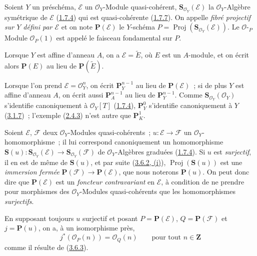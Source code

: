 \begin{definition}[4.1.1]
\label{II.4.1.1-fr}
Soient $Y$ un préschéma, $\mathcal{E}$ un $\mathcal{O}_Y$-Module
quasi-cohérent, $\mathbf{S}_{\mathcal{O}_Y}(\mathcal{E})$ la
$\mathcal{O}_Y$-Algèbre symétrique de $\mathcal{E}$
\textup{(\hyperref[II.1.7.4-fr]{1.7.4})} qui est quasi-cohérente
\textup{(\hyperref[II.1.7.7-fr]{1.7.7})}. On appelle \emph{fibré projectif sur $Y$
défini par $\mathcal{E}$} et on note $\mathbf{P}(\mathcal{E})$ le $Y$-schéma
$P=\operatorname{Proj}(\mathbf{S}_{\mathcal{O}_Y}(\mathcal{E}))$. Le
$\mathcal{O}$-${}_P$Module $\mathcal{O}_P(1)$ est appelé le faisceau
fondamental sur $P$.
\end{definition}

Lorsque $Y$ est affine d'anneau $A$, on a $\mathcal{E}=\widetilde{E}$, où
$E$ est un $A$-module, et on écrit alors $\mathbf{P}(E)$ au lieu de
$\mathbf{P}(\widetilde{E})$.

Lorsque l'on prend $\mathcal{E}=\mathcal{O}_Y^n$, on écrit
$\mathbf{P}_Y^{n-1}$ au lieu de $\mathbf{P}(\mathcal{E})$~; si de plus $Y$
est affine d'anneau $A$, on écrit aussi $\mathbf{P}_A^{n-1}$ au lieu de
$\mathbf{P}_Y^{n-1}$. Comme
$\mathbf{S}_{\mathcal{O}_Y}(\mathcal{O}_Y)$ s'identifie canoniquement à
$\mathcal{O}_Y[T]$ (\hyperref[II.1.7.4-fr]{1.7.4}),
$\mathbf{P}_Y^0$ s'identifie canoniquement à $Y$
(\hyperref[II.3.1.7-fr]{3.1.7})~; l'exemple
(\hyperref[II.2.4.3-fr]{2.4.3}) n'est autre que $\mathbf{P}_K^1$.

\begin{env}[4.1.2]
\label{II.4.1.2-fr}
Soient $\mathcal{E}$, $\mathcal{F}$ deux $\mathcal{O}_Y$-Modules
quasi-cohérents~; $u:\mathcal{E}\to\mathcal{F}$ un
$\mathcal{O}_Y$-homomorphisme~; il lui correspond canoniquement un
homomorphisme
$\mathbf{S}(u):\mathbf{S}_{\mathcal{O}_Y}(\mathcal{E})\to
\mathbf{S}_{\mathcal{O}_Y}(\mathcal{F})$ de $\mathcal{O}_Y$-Algèbres
graduées (\hyperref[II.1.7.4-fr]{1.7.4}). Si $u$ est \emph{surjectif}, il en
est de même de $\mathbf{S}(u)$, et par suite
(\hyperref[II.3.6.2-fr]{3.6.2, (i)}),
$\operatorname{Proj}(\mathbf{S}(u))$ est une \emph{immersion fermée}
$\mathbf{P}(\mathcal{F})\to\mathbf{P}(\mathcal{E})$, que nous noterons
$\mathbf{P}(u)$. On peut donc dire que $\mathbf{P}(\mathcal{E})$ est un
\emph{foncteur contravariant} en $\mathcal{E}$, à condition de ne prendre
pour morphismes des $\mathcal{O}_Y$-Modules quasi-cohérents que les
homomorphismes \emph{surjectifs}.

En supposant toujours $u$ surjectif et posant
$P=\mathbf{P}(\mathcal{E})$, $Q=\mathbf{P}(\mathcal{F})$ et
$j=\mathbf{P}(u)$, on a, à un isomorphisme près,
\[
\label{II.4.1.2.1-fr}
  j^*(\mathcal{O}_P(n))=\mathcal{O}_Q(n)
  \qquad\text{pour tout }n\in\mathbf{Z}
\tag{4.1.2.1}
\]
comme il résulte de (\hyperref[II.3.6.3-fr]{3.6.3}).
\end{env}

